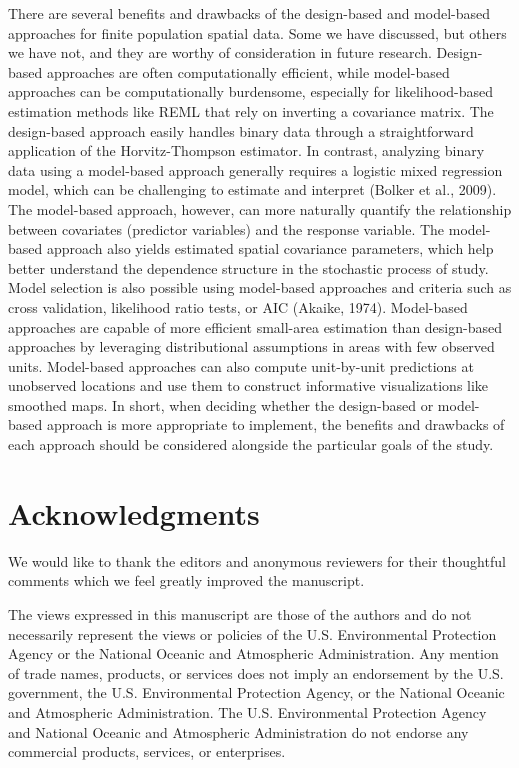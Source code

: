 \documentclass[]{elsarticle} %
\begin{document}
There are several benefits and drawbacks of the design-based and
model-based approaches for finite population spatial data. Some we have
discussed, but others we have not, and they are worthy of consideration
in future research. Design-based approaches are often computationally
efficient, while model-based approaches can be computationally
burdensome, especially for likelihood-based estimation methods like REML
that rely on inverting a covariance matrix. The design-based approach
easily handles binary data through a straightforward application of the
Horvitz-Thompson estimator. In contrast, analyzing binary data using a
model-based approach generally requires a logistic mixed regression
model, which can be challenging to estimate and interpret (Bolker et
al., 2009). The model-based approach, however, can more naturally
quantify the relationship between covariates (predictor variables) and
the response variable. The model-based approach also yields estimated
spatial covariance parameters, which help better understand the
dependence structure in the stochastic process of study. Model selection
is also possible using model-based approaches and criteria such as cross
validation, likelihood ratio tests, or AIC (Akaike, 1974). Model-based
approaches are capable of more efficient small-area estimation than
design-based approaches by leveraging distributional assumptions in
areas with few observed units. Model-based approaches can also compute
unit-by-unit predictions at unobserved locations and use them to
construct informative visualizations like smoothed maps. In short, when
deciding whether the design-based or model-based approach is more
appropriate to implement, the benefits and drawbacks of each approach
should be considered alongside the particular goals of the study.

\hypertarget{acknowledgments}{%
\section*{Acknowledgments}\label{acknowledgments}}

We would like to thank the editors and anonymous reviewers for their
thoughtful comments which we feel greatly improved the manuscript.

The views expressed in this manuscript are those of the authors and do
not necessarily represent the views or policies of the U.S.
Environmental Protection Agency or the National Oceanic and Atmospheric
Administration. Any mention of trade names, products, or services does
not imply an endorsement by the U.S. government, the U.S. Environmental
Protection Agency, or the National Oceanic and Atmospheric
Administration. The U.S. Environmental Protection Agency and National
Oceanic and Atmospheric Administration do not endorse any commercial
products, services, or enterprises.
\end{document}
